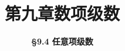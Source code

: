 \usepackage{arydshln}
\everymath{\displaystyle}



\title[第九章\\
数项级数]{\texorpdfstring{\LARGE \bfseries 第九章\quad 数项级数}{第九章 数项级数}} %
\author[\smaller \S 9.4\\
任意项级数] %
{\Large \bfseries \S 9.4 任意项级数}
\date{}





\begin{frame}

\titlepage %

\end{frame}


